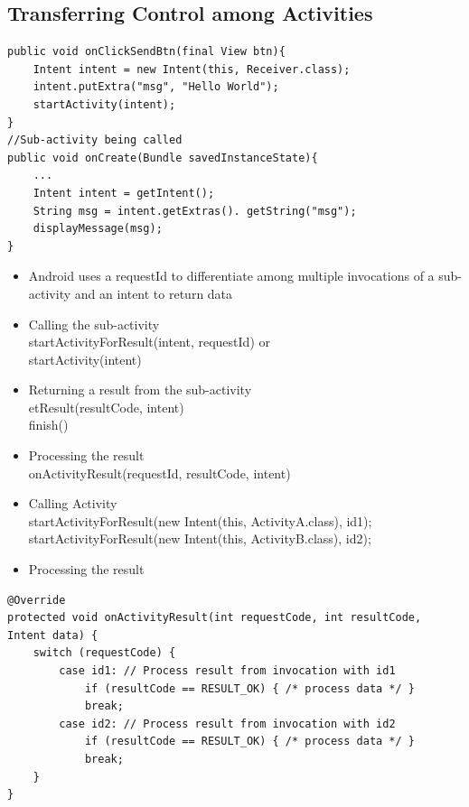 \subsection{Transferring Control among Activities}

\begin{breakbox}
\begin{lstlisting}
public void onClickSendBtn(final View btn){
    Intent intent = new Intent(this, Receiver.class);
    intent.putExtra("msg", "Hello World");
    startActivity(intent);
}
//Sub-activity being called
public void onCreate(Bundle savedInstanceState){
    ...
    Intent intent = getIntent();
    String msg = intent.getExtras(). getString("msg");
    displayMessage(msg);
}
\end{lstlisting}
\end{breakbox}

\begin{breakbox}
\begin{itemize}
\tightlist
\item
  Android uses a requestId to differentiate among multiple invocations
  of a sub-activity and an intent to return data
\item
  Calling the sub-activity\\
  startActivityForResult(intent, requestId) or\\
  startActivity(intent)
\item
  Returning a result from the sub-activity\\
  etResult(resultCode, intent)\\
  finish()
\item
  Processing the result\\
  onActivityResult(requestId, resultCode, intent)
\item
  Calling Activity\\
  startActivityForResult(new Intent(this, ActivityA.class), id1);\\
  startActivityForResult(new Intent(this, ActivityB.class), id2);
\item
  Processing the result
\end{itemize}
\end{breakbox}

\begin{breakbox}
\begin{lstlisting}
@Override
protected void onActivityResult(int requestCode, int resultCode, Intent data) {
    switch (requestCode) {
        case id1: // Process result from invocation with id1
            if (resultCode == RESULT_OK) { /* process data */ }
            break;
        case id2: // Process result from invocation with id2
            if (resultCode == RESULT_OK) { /* process data */ }
            break;
    }
}
\end{lstlisting}
\end{breakbox}


